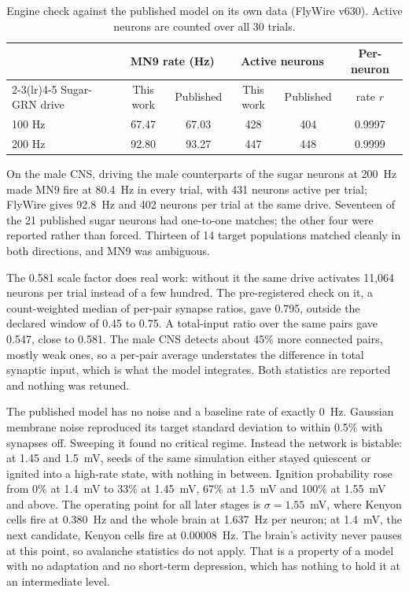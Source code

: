 \documentclass[11pt]{article}
\begin{document}
\begin{table}[t]
\centering\small
\caption{Engine check against the published model on its own data (FlyWire v630). Active neurons are counted over all 30 trials.}
\label{tab:engine}
\begin{tabular}{@{}lccccc@{}}
\toprule
 & \multicolumn{2}{c}{MN9 rate (Hz)} & \multicolumn{2}{c}{Active neurons} & Per-neuron \\
\cmidrule(lr){2-3}\cmidrule(lr){4-5}
Sugar-GRN drive & This work & Published & This work & Published & rate $r$ \\
\midrule
100 Hz & 67.47 & 67.03 & 428 & 404 & 0.9997 \\
200 Hz & 92.80 & 93.27 & 447 & 448 & 0.9999 \\
\bottomrule
\end{tabular}
\end{table}

On the male CNS, driving the male counterparts of the sugar neurons at 200~Hz made MN9 fire at 80.4~Hz in every trial, with 431 neurons active per trial; FlyWire gives 92.8~Hz and 402 neurons per trial at the same drive. Seventeen of the 21 published sugar neurons had one-to-one matches; the other four were reported rather than forced. Thirteen of 14 target populations matched cleanly in both directions, and MN9 was ambiguous.

The 0.581 scale factor does real work: without it the same drive activates 11,064 neurons per trial instead of a few hundred. The pre-registered check on it, a count-weighted median of per-pair synapse ratios, gave 0.795, outside the declared window of 0.45 to 0.75. A total-input ratio over the same pairs gave 0.547, close to 0.581. The male CNS detects about 45\% more connected pairs, mostly weak ones, so a per-pair average understates the difference in total synaptic input, which is what the model integrates. Both statistics are reported and nothing was retuned.

The published model has no noise and a baseline rate of exactly 0~Hz. Gaussian membrane noise reproduced its target standard deviation to within 0.5\% with synapses off. Sweeping it found no critical regime. Instead the network is bistable: at 1.45 and 1.5~mV, seeds of the same simulation either stayed quiescent or ignited into a high-rate state, with nothing in between. Ignition probability rose from 0\% at 1.4~mV to 33\% at 1.45~mV, 67\% at 1.5~mV and 100\% at 1.55~mV and above. The operating point for all later stages is $\sigma = 1.55$~mV, where Kenyon cells fire at 0.380~Hz and the whole brain at 1.637~Hz per neuron; at 1.4~mV, the next candidate, Kenyon cells fire at 0.00008~Hz. The brain's activity never pauses at this point, so avalanche statistics do not apply. That is a property of a model with no adaptation and no short-term depression, which has nothing to hold it at an intermediate level.
\end{document}
